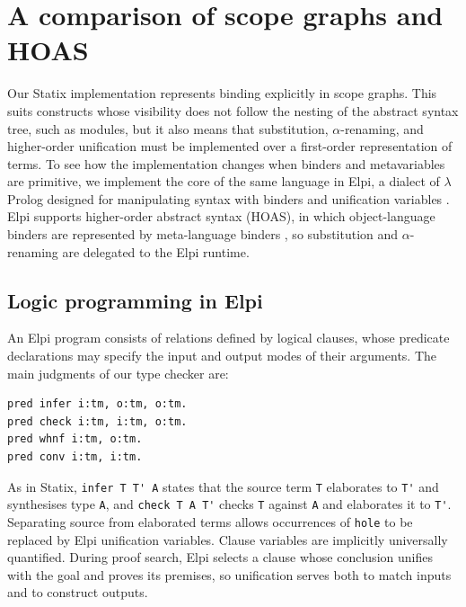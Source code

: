 \section{\label{sec:ScopeGraphs}A comparison of scope graphs and HOAS}

Our Statix implementation represents binding explicitly in scope graphs. This
suits constructs whose visibility does not follow the nesting of the abstract
syntax tree, such as modules, but it also means that substitution,
$\alpha$-renaming, and higher-order unification must be implemented over a
first-order representation of terms. To see how the implementation changes when
binders and metavariables are primitive, we implement the core of the same
language in Elpi, a dialect of $\lambda$Prolog designed for manipulating syntax
with binders and unification variables \autocite{dunchev_elpi_2015}. Elpi
supports higher-order abstract syntax (HOAS), in which object-language binders
are represented by meta-language binders \autocite{pfenning_higher-order_nodate},
so substitution and $\alpha$-renaming are delegated to the Elpi runtime.

\subsection{Logic programming in Elpi}

An Elpi program consists of relations defined by logical clauses, whose
predicate declarations may specify the input and output modes of their
arguments. The main judgments of our type checker are:

\begin{lstlisting}[language=Elpi, caption={The principal relations of the Elpi type checker},
label={lst:elpi-judgements}]
pred infer i:tm, o:tm, o:tm.
pred check i:tm, i:tm, o:tm.
pred whnf i:tm, o:tm.
pred conv i:tm, i:tm.
\end{lstlisting}

As in Statix, \lstinline|infer T T' A| states that the source term
\lstinline|T| elaborates to \lstinline|T'| and synthesises type \lstinline|A|,
and \lstinline|check T A T'| checks \lstinline|T| against \lstinline|A| and
elaborates it to \lstinline|T'|. Separating source from elaborated terms allows
occurrences of \lstinline|hole| to be replaced by Elpi unification variables.
Clause variables are implicitly universally quantified. During proof search,
Elpi selects a clause whose conclusion unifies with the goal and proves its
premises, so unification serves both to match inputs and to construct outputs.

